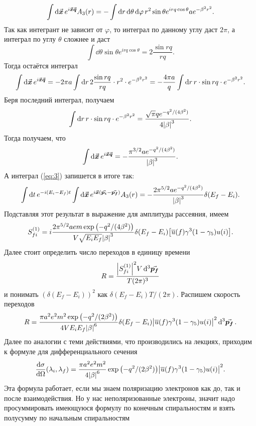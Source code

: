 \documentclass[12pt]{article}
\begin{document}
	$$ \int\dd{\va*{x}} e^{i\va*{x}\va*{q}} A_3(r) = - \int \dd{r} \dd{\theta} \dd{\varphi} r^2 \sin{\theta} e^{irq\cos{\theta}} a e^{-\beta^2r^2}. $$
	Так как интегрант не зависит от $\varphi$, то интеграл по данному углу даст $2\pi$, а интеграл по углу $\theta$ сложнее и даст
	$$ \int\dd{\theta} \sin{\theta} e^{irq\cos{\theta}} = 2\dfrac{\sin{rq}}{rq}.$$
	Тогда остаётся интеграл
	$$ \int\dd{\va*{x}} e^{i\va*{x}\va*{q}} = -2 \pi a \int \dd{r} 2\dfrac{\sin{rq}}{rq} \cdot r^2 \cdot e^{-\beta^2r^2} = -\dfrac{4\pi a}{q} \int \dd{r} r \cdot \sin{rq} \cdot e^{-\beta^2r^2}.$$
	Беря последний интеграл, получаем
	$$ \int \dd{r} r \cdot \sin{rq} \cdot e^{-\beta^2r^2} = \dfrac{\sqrt{\pi}qe^{-{q^2}/(4\beta^2)}}{4\abs{\beta}^3}. $$
	Тогда получаем, что
	$$ \int\dd{\va*{x}} e^{i\va*{x}\va*{q}} = -\dfrac{\pi^{3/2} a e^{-{q^2}/(4\beta^2)}}{\abs{\beta}^3}. $$
	А интеграл (\ref{eq:3}) запишется в итоге так:
	\begin{equation*}
		\int \dd{t} e^{-i\qty(E_i - E_f)t} \int\dd{\va*{x}} e^{i\va*{x}(\va*{p_i} - \va*{p_f})} A_3(r) = -\dfrac{2\pi^{5/2} a e^{-{q^2}/(4\beta^2)}}{\abs{\beta}^3} \delta\qty(E_f - E_i).
	\end{equation*}
	Подставляя этот результат в выражение для амплитуды рассеяния, имеем
	\begin{equation}\label{eq:4}
		S_{fi}^{(1)} = i\dfrac{2\pi^{5/2} a e m \exp\qty(-{q^2}/(4\beta^2))}{V \sqrt{E_i E_f}\abs{\beta}^3} \delta\qty(E_f - E_i) \qty[\overline{u}(f)\gamma^3(1-\gamma_5)u(i)].
	\end{equation}
	Далее стоит определить число переходов в единицу времени
	$$ R = \dfrac{\abs{S_{fi}^{(1)}}^2V \dd{{}^3\va*{p_f}}}{T (2\pi)^3} $$
	и понимать $(\delta(E_f - E_i))^2$ как $\delta(E_f - E_i)T/(2\pi)$. Распишем скорость переходов
	$$ R = \dfrac{\pi a^2 e^2 m^2 \exp\qty(-{q^2}/(2\beta^2))}{4 V E_i E_f \abs{\beta}^6} \delta\qty(E_f - E_i) \abs{\overline{u}(f)\gamma^3(1-\gamma_5)u(i)}^2 \dd{{}^3\va*{p_f}}. $$
	Далее по аналогии с теми действиями, что производились на лекциях, приходим к формуле для дифференциального сечения
	\begin{equation}
		\dv{\sigma}{\Omega} \qty(\lambda_i, \lambda_f) = \dfrac{\pi a^2 e^2 m^2}{4 \abs{\beta}^6} \exp\qty(-{q^2}/(2\beta^2)) \abs{\overline{u}(f)\gamma^3(1-\gamma_5)u(i)}^2.
	\end{equation}
	Эта формула работает, если мы знаем поляризацию электронов как до, так и после взаимодействия. Но у нас неполяризованные электроны, значит надо просуммировать имеющуюся формулу по конечным спиральностям и взять полусумму по начальным спиральностям
\end{document}
